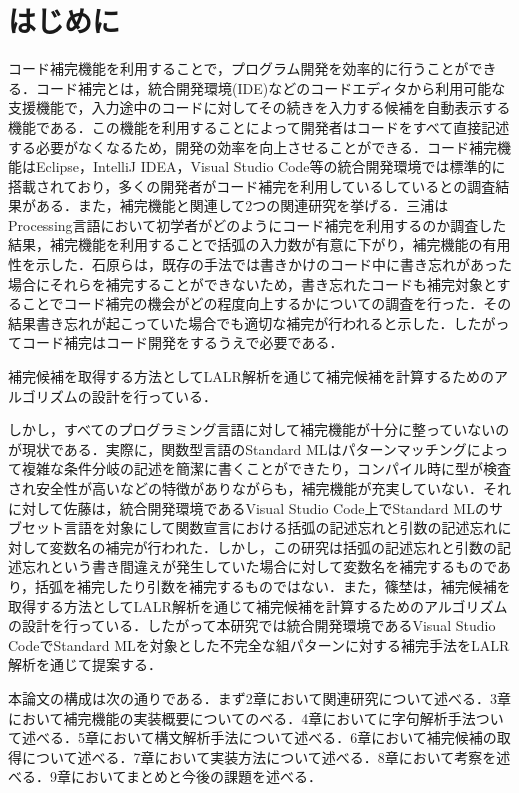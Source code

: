 \documentclass[12pt,a4j]{jreport}
\begin{document}
\chapter{はじめに}
コード補完機能を利用することで，プログラム開発を効率的に行うことができる．コード補完とは，統合開発環境(IDE)などのコードエディタから利用可能な支援機能で，入力途中のコードに対してその続きを入力する候補を自動表示する機能である．この機能を利用することによって開発者はコードをすべて直接記述する必要がなくなるため，開発の効率を向上させることができる．コード補完機能はEclipse，IntelliJ IDEA，Visual Studio Code等の統合開発環境では標準的に搭載されており，多くの開発者がコード補完を利用しているしているとの調査結果がある\cite{useIDE}．また，補完機能と関連して2つの関連研究を挙げる．三浦\cite{eff}はProcessing言語において初学者がどのようにコード補完を利用するのか調査した結果，補完機能を利用することで括弧の入力数が有意に下がり，補完機能の有用性を示した．石原\cite{hos}らは，既存の手法では書きかけのコード中に書き忘れがあった場合にそれらを補完することができないため，書き忘れたコードも補完対象とすることでコード補完の機会がどの程度向上するかについての調査を行った．その結果書き忘れが起こっていた場合でも適切な補完が行われると示した．したがってコード補完はコード開発をするうえで必要である．

\cite{SASANO2023102957}補完候補を取得する方法としてLALR解析を通じて補完候補を計算するためのアルゴリズムの設計を行っている．


しかし，すべてのプログラミング言語に対して補完機能が十分に整っていないのが現状である．実際に，関数型言語のStandard ML\cite{StandardML}はパターンマッチングによって複雑な条件分岐の記述を簡潔に書くことができたり，コンパイル時に型が検査され安全性が高いなどの特徴がありながらも，補完機能が充実していない．それに対して佐藤は\cite{sato}，統合開発環境であるVisual Studio Code\cite{vscode}上でStandard MLのサブセット言語を対象にして関数宣言における括弧の記述忘れと引数の記述忘れに対して変数名の補完が行われた．しかし，この研究は括弧の記述忘れと引数の記述忘れという書き間違えが発生していた場合に対して変数名を補完するものであり，括弧を補完したり引数を補完するものではない．また，篠埜\cite{SASANO2023102957}は，補完候補を取得する方法としてLALR解析を通じて補完候補を計算するためのアルゴリズムの設計を行っている．したがって本研究では統合開発環境であるVisual Studio CodeでStandard MLを対象とした不完全な組パターンに対する補完手法をLALR解析を通じて提案する．

本論文の構成は次の通りである．まず2章において関連研究について述べる．3章において補完機能の実装概要についてのべる．4章においてに字句解析手法ついて述べる．5章において構文解析手法について述べる．6章において補完候補の取得について述べる．7章において実装方法について述べる．8章において考察を述べる．9章においてまとめと今後の課題を述べる．
\end{document}
